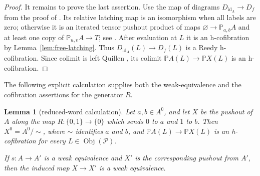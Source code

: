\documentclass[12pt,a4paper]{amsart}
\newcommand{\Pcat}{\mathcal P}
\newcommand{\Path}{\mathbb P}
\newcommand{\id}{\operatorname{id}}
\newcommand{\Obj}{\operatorname{Obj}}
\newtheorem{lem}[thm]{Lemma}
\theoremstyle{definition}
\begin{document}
\begin{proof}
It remains to prove the last assertion.  Use the map of diagrams \(D_{\id_A}\to D_f\) from the proof of \cite[Theorem~9.10]{Moore1}.  Its relative latching map is an isomorphism when all labels are zero; otherwise it is an iterated tensor pushout product of maps \(\varnothing\to\Path_{a,b}A\) and at least one copy of \(\Path_{u,v}A\to T\); see \cite[proof of Theorem~9.10, cases (a) and (b)]{Moore1}.  After evaluation at \(L\) it is an h-cofibration by Lemma~\ref{lem:free-latching}.  Thus \(D_{\id_A}(L)\to D_f(L)\) is a Reedy h-cofibration.  Since colimit is left Quillen \cite[Theorem~9.6]{Moore1}, its colimit \(\Path A(L)\to\Path X(L)\) is an h-cofibration.
\end{proof}


The following explicit calculation supplies both the weak-equivalence and the cofibration assertions for the generator \(R\).

\begin{lem}[reduced-word calculation]\label{lem:R-step}
Let \(a,b\in A^0\), and let \(X\) be the pushout of \(A\) along the map \(R:\{0,1\}\to\{0\}\) which sends \(0\) to \(a\) and \(1\) to \(b\). Then \(X^0=A^0/{\sim}\), where \(\sim\) identifies \(a\) and \(b\), and \(\Path A(L)\to\Path X(L)\) is an h-cofibration for every \(L\in\Obj(\Pcat)\).

If \(s: A\to A'\) is a weak equivalence and \(X'\) is the corresponding pushout from \(A'\), then the induced map \(X\to X'\) is a weak equivalence.
\end{lem}
\end{document}
